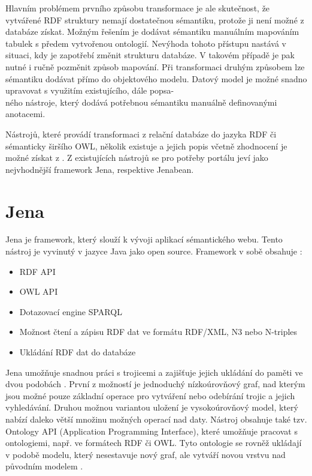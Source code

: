 \documentclass{projekt}
\begin{document}
Hlavním problémem prvního způsobu transformace je ale skutečnost, že vytvářené RDF struktury nemají dostatečnou sémantiku, protože ji není možné z databáze získat. 
Možným řešením je dodávat sémantiku manuálním mapováním tabulek s předem vytvořenou ontologií. Nevýhoda tohoto přístupu nastává v situaci, kdy je zapotřebí změnit strukturu databáze. V takovém případě je pak nutné i ručně pozměnit způsob mapování.
Při transformaci druhým způsobem lze sémantiku dodávat přímo do objektového modelu. 
Datový model je možné snadno upravovat s využitím existujícího, dále popsa-\\ného nástroje, který dodává potřebnou sémantiku manuálně definovanými anotacemi.


Nástrojů, které provádí transformaci z relační databáze do jazyka RDF či sémanticky širšího OWL, několik existuje a jejich popis včetně zhodnocení je možné získat z \cite{diplomka}.
Z existujících nástrojů se pro potřeby portálu jeví jako nejvhodnější framework Jena, respektive Jenabean.



\section{Jena}

\hspace{0.65cm}Jena je framework, který slouží k vývoji aplikací sémantického webu. Tento nástroj je vyvinutý v jazyce Java jako open source. 
Framework v sobě obsahuje \cite{devet}:

\begin{itemize}
\item RDF API
\item OWL API
\item Dotazovací engine SPARQL
\item Možnost čtení a zápisu RDF dat ve formátu RDF/XML, N3 nebo N-triples
\item Ukládání RDF dat do databáze
\end{itemize}

Jena umožňuje snadnou práci s trojicemi a zajišťuje jejich ukládání do paměti ve dvou podobách \cite{diplomka}. První z možností je jednoduchý nízkoúrovňový graf, nad kterým jsou možné pouze základní operace pro vytváření nebo odebírání trojic a jejich vyhledávání.
Druhou možnou variantou uložení je vysokoúrovňový model, který nabízí daleko větší množinu možných operací nad daty. Nástroj obsahuje také tzv. Ontology API (Application Programming Interface), které umožňuje pracovat s ontologiemi, např. ve formátech RDF či OWL. Tyto ontologie se rovněž ukládají v podobě modelu, který nesestavuje nový graf, ale vytváří novou vrstvu nad původním modelem \cite{devet}.
\end{document}
